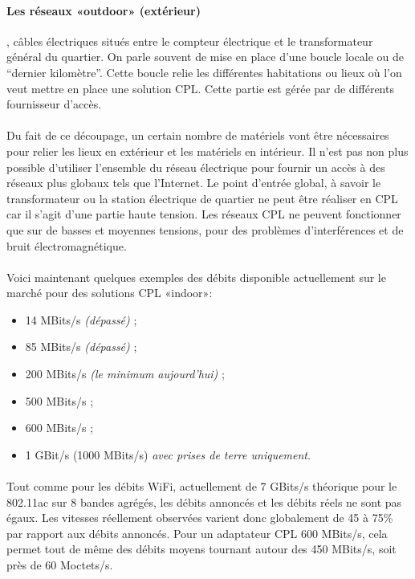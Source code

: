             \paragraph{Les réseaux «outdoor» (extérieur)}
, câbles électriques situés entre le compteur électrique et le transformateur général du quartier.
On parle souvent de mise en place d’une boucle locale ou de “dernier kilomètre”.
Cette boucle relie les différentes habitations ou lieux où l'on veut mettre en place une solution CPL.
Cette partie est gérée par de différents fournisseur d'accès.
            \paragraph{}
Du fait de ce découpage, un certain nombre de matériels vont être nécessaires pour relier les lieux en extérieur et les matériels en intérieur.
Il n'est pas non plus possible d'utiliser l'ensemble du réseau électrique pour fournir un accès à des réseaux plus globaux tels que l’Internet.
Le point d'entrée global, à savoir le transformateur ou la station électrique de quartier ne peut être réaliser en CPL car il s'agit d'une partie haute tension.
Les réseaux CPL ne peuvent fonctionner que sur de basses et moyennes tensions, pour des problèmes d'interférences et de bruit électromagnétique.
            \paragraph{}
Voici maintenant quelques exemples des débits disponible actuellement sur le marché pour des solutions CPL «indoor»:
                \begin{itemize}
                    \item 14 MBits/s \emph{(dépassé)} ;
                    \item 85 MBits/s \emph{(dépassé)} ;
                    \item 200 MBits/s \emph{(le minimum aujourd’hui)} ;
                    \item 500 MBits/s ;
                    \item 600 MBits/s ;
                    \item 1 GBit/s (1000 MBits/s) \emph{avec prises de terre uniquement}.
                \end{itemize}
            \paragraph{}
Tout comme pour les débits WiFi, actuellement de 7 GBits/s théorique pour le 802.11ac sur 8 bandes agrégés,
les débits annoncés et les débits réels ne sont pas égaux.
Les vitesses réellement observées varient donc globalement de 45 à 75\% par rapport aux débits annoncés.
Pour un adaptateur CPL 600 MBits/s, cela permet tout de même des débits moyens tournant autour des 450 MBits/s, soit près de 60 Moctets/s.


